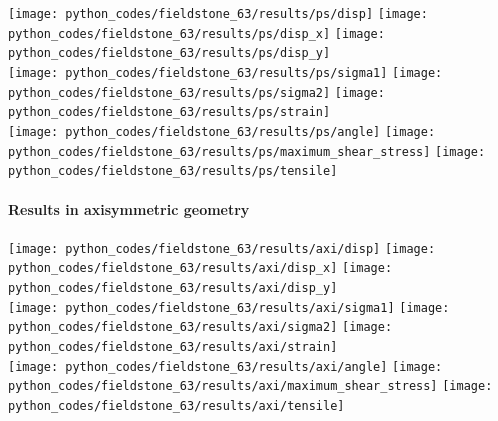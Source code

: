 \begin{center}
\texttt{[image: python\_codes/fieldstone\_63/results/ps/disp]}
\texttt{[image: python\_codes/fieldstone\_63/results/ps/disp\_x]}
\texttt{[image: python\_codes/fieldstone\_63/results/ps/disp\_y]}\\
\texttt{[image: python\_codes/fieldstone\_63/results/ps/sigma1]}
\texttt{[image: python\_codes/fieldstone\_63/results/ps/sigma2]}
\texttt{[image: python\_codes/fieldstone\_63/results/ps/strain]}\\
\texttt{[image: python\_codes/fieldstone\_63/results/ps/angle]}
\texttt{[image: python\_codes/fieldstone\_63/results/ps/maximum\_shear\_stress]}
\texttt{[image: python\_codes/fieldstone\_63/results/ps/tensile]}
\end{center}

\newpage
\paragraph{Results in axisymmetric geometry}

\begin{center}
\texttt{[image: python\_codes/fieldstone\_63/results/axi/disp]}
\texttt{[image: python\_codes/fieldstone\_63/results/axi/disp\_x]}
\texttt{[image: python\_codes/fieldstone\_63/results/axi/disp\_y]}\\
\texttt{[image: python\_codes/fieldstone\_63/results/axi/sigma1]}
\texttt{[image: python\_codes/fieldstone\_63/results/axi/sigma2]}
\texttt{[image: python\_codes/fieldstone\_63/results/axi/strain]}\\
\texttt{[image: python\_codes/fieldstone\_63/results/axi/angle]}
\texttt{[image: python\_codes/fieldstone\_63/results/axi/maximum\_shear\_stress]}
\texttt{[image: python\_codes/fieldstone\_63/results/axi/tensile]}
\end{center}

